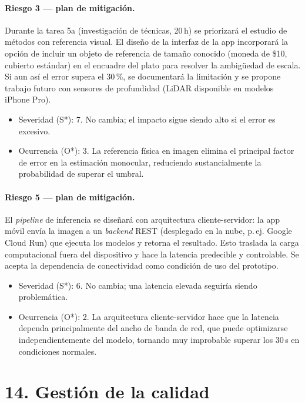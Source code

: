\documentclass[
11pt, %
]{charter}
\begin{document}
\paragraph{Riesgo 3 --- plan de mitigación.}
Durante la tarea 5a (investigación de técnicas, 20\,h) se priorizará el estudio de métodos con referencia visual. El diseño de la interfaz de la app incorporará la opción de incluir un objeto de referencia de tamaño conocido (moneda de \$10, cubierto estándar) en el encuadre del plato para resolver la ambigüedad de escala. Si aun así el error supera el 30\,\%, se documentará la limitación y se propone trabajo futuro con sensores de profundidad (LiDAR disponible en modelos iPhone Pro).
\begin{itemize}
	\item Severidad (S*): 7. No cambia; el impacto sigue siendo alto si el error es excesivo.
	\item Ocurrencia (O*): 3. La referencia física en imagen elimina el principal factor de error en la estimación monocular, reduciendo sustancialmente la probabilidad de superar el umbral.
\end{itemize}

\paragraph{Riesgo 5 --- plan de mitigación.}
El \textit{pipeline} de inferencia se diseñará con arquitectura cliente-servidor: la app móvil envía la imagen a un \textit{backend} REST (desplegado en la nube, p.\,ej. Google Cloud Run) que ejecuta los modelos y retorna el resultado. Esto traslada la carga computacional fuera del dispositivo y hace la latencia predecible y controlable. Se acepta la dependencia de conectividad como condición de uso del prototipo.
\begin{itemize}
	\item Severidad (S*): 6. No cambia; una latencia elevada seguiría siendo problemática.
	\item Ocurrencia (O*): 2. La arquitectura cliente-servidor hace que la latencia dependa principalmente del ancho de banda de red, que puede optimizarse independientemente del modelo, tornando muy improbable superar los 30\,s en condiciones normales.
\end{itemize}


\section{14. Gestión de la calidad}
\label{sec:calidad}
\end{document}
